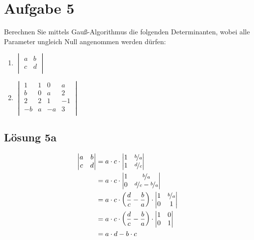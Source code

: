 \documentclass[main.tex]{subfiles}
\begin{document}
\section{Aufgabe 5}
Berechnen Sie mittels Gauß-Algorithmus die folgenden Determinanten, wobei alle Parameter ungleich Null angenommen werden dürfen:

\begin{enumerate}
    \item $\begin{vmatrix}
        a & b \\
        c & d \\
    \end{vmatrix}$
    \item $\begin{vmatrix}
         1 & 1 &  0 &  a \\
         b & 0 &  a &  2 \\
         2 & 2 &  1 & -1 \\
        -b & a & -a &  3 \\
    \end{vmatrix}$
\end{enumerate}

\subsection{Lösung 5a}
\begin{align*}
    \begin{vmatrix}
        a & b \\
        c & d \\
    \end{vmatrix}
    &= a \cdot c \cdot \begin{vmatrix}
        1 & \nicefrac{b}{a} \\
        1 & \nicefrac{d}{c} \\
    \end{vmatrix} \\
    &= a \cdot c \cdot \begin{vmatrix}
        1 & \nicefrac{b}{a} \\
        0 & \nicefrac{d}{c} - \nicefrac{b}{a} \\
    \end{vmatrix} \\
    &= a \cdot c \cdot \left(\frac{d}{c} - \frac{b}{a}\right) \cdot \begin{vmatrix}
        1 & \nicefrac{b}{a} \\
        0 & 1 \\
    \end{vmatrix} \\
    &= a \cdot c \cdot \left(\frac{d}{c} - \frac{b}{a}\right) \cdot \begin{vmatrix}
        1 & 0 \\
        0 & 1 \\
    \end{vmatrix} \\
    &= a\cdot d - b\cdot c \\
\end{align*}
\end{document}
